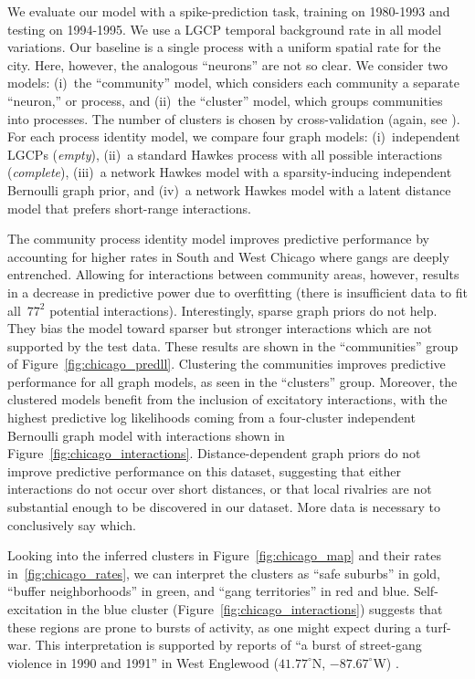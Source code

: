 We evaluate our model with a spike-prediction task, training on
1980-1993 and testing on 1994-1995. We use a LGCP temporal background
rate in all model variations. Our baseline is a single process with a
uniform spatial rate for the city. Here, however, the analogous ``neurons''
are not so clear. We consider two models:  (i)~the ``community'' model, which considers each community a separate ``neuron,'' or process, and (ii)~the ``cluster'' model, which groups
communities into processes. The number of clusters is chosen by
cross-validation (again, see \citet{linderman2014discovering}).
For each process identity model, we compare four graph models:
(i)~independent LGCPs
(\emph{empty}),
(ii)~a standard Hawkes process with all possible
interactions (\emph{complete}),
(iii)~a network Hawkes model with a
sparsity-inducing independent Bernoulli graph prior, and
(iv)~a network Hawkes
model with a latent distance model that prefers short-range
interactions.

The community process identity model improves predictive performance
by accounting for higher rates in South and West Chicago where gangs
are deeply entrenched. Allowing for interactions between community
areas, however, results in a decrease in predictive power due to
overfitting (there is insufficient data to fit all~${77^2}$ potential
interactions). Interestingly, sparse graph priors do not help. They
bias the model toward sparser but stronger interactions which are not
supported by the test data. These results are shown in the
``communities'' group of Figure~\ref{fig:chicago_predll}. Clustering
the communities improves predictive performance for all graph models,
as seen in the ``clusters'' group. Moreover, the clustered models
benefit from the inclusion of excitatory interactions, with the
highest predictive log likelihoods coming from a four-cluster
independent Bernoulli graph model with interactions shown in
Figure~\ref{fig:chicago_interactions}. Distance-dependent graph priors
do not improve predictive performance on this dataset, suggesting that
either interactions do not occur over short distances, or that local
rivalries are not substantial enough to be discovered in our
dataset. More data is necessary to conclusively say which.

Looking into the inferred clusters in Figure~\ref{fig:chicago_map} and
their rates in~\ref{fig:chicago_rates}, we can interpret the clusters
as ``safe suburbs'' in gold, ``buffer neighborhoods'' in green, and
``gang territories'' in red and blue. Self-excitation in the blue
cluster (Figure~\ref{fig:chicago_interactions}) suggests that these
regions are prone to bursts of activity, as one might expect during a
turf-war. This interpretation is supported by reports of ``a burst of
street-gang violence in 1990 and 1991'' in West Englewood
(${41.77^\circ}$N, ${-87.67^\circ}$W) \citep{Block-1993}.

